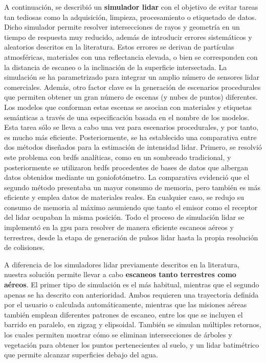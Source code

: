 A continuación, se describió un \textbf{simulador \acrshort{lidar}} con el objetivo de evitar tareas tan tediosas como la adquisición, limpieza, procesamiento o etiquetado de datos. Dicho simulador permite resolver intersecciones de rayos y geometría en un tiempo de respuesta muy reducido, además de introducir errores sistemáticos y aleatorios descritos en la literatura. Estos errores se derivan de partículas atmosféricas, materiales con una reflectancia elevada, o bien se corresponden con la distancia de escaneo o la inclinación de la superficie intersectada. La simulación se ha parametrizado para integrar un amplio número de sensores \acrshort{lidar} comerciales. Además, otro factor clave es la generación de escenarios procedurales que permiten obtener un gran número de escenas (y nubes de puntos) diferentes. Los modelos que conforman estas escenas se asocian con materiales y etiquetas semánticas a través de una especificación basada en el nombre de los modelos. Esta tarea sólo se lleva a cabo una vez para escenarios procedurales, y por tanto, es mucho más eficiente. Posteriormente, se ha establecido una comparativa entre dos métodos diseñados para la estimación de intensidad \acrshort{lidar}. Primero, se resolvió este problema con \acrshort{brdf}s analíticas, como en un sombreado tradicional, y posteriormente se utilizaron \acrshort{brdf}s procedentes de bases de datos que albergan datos obtenidos mediante un goniofotómetro. La comparativa evidenció que el segundo método presentaba un mayor consumo de memoria, pero también es más eficiente y emplea datos de materiales reales. En cualquier caso, se redujo su consumo de memoria al máximo asumiendo que tanto el emisor como el receptor del \acrshort{lidar} ocupaban la misma posición. Todo el proceso de simulación \acrshort{lidar} se implementó en la \acrshort{gpu} para resolver de manera eficiente escaneos aéreos y terrestres, desde la etapa de generación de pulsos \acrshort{lidar} hasta la propia resolución de colisiones.

A diferencia de los simuladores \acrshort{lidar} previamente descritos en la literatura, nuestra solución permite llevar a cabo \textbf{escaneos tanto terrestres como aéreos}. El primer tipo de simulación es el más habitual, mientras que el segundo apenas se ha descrito con anterioridad. Ambos requieren una trayectoria definida por el usuario o calculada automáticamente, mientras que las misiones aéreas también emplean diferentes patrones de escaneo, entre los que se incluyen el barrido en paralelo, en zigzag y elipsoidal. También se simulan múltiples retornos, los cuales permiten mostrar cómo se eliminan intersecciones de árboles y vegetación para obtener los puntos pertenecientes al suelo, y un \acrshort{lidar} batimétrico que permite alcanzar superficies debajo del agua. 


